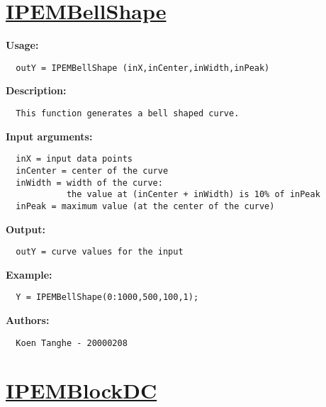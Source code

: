\newpage
\section*{\hyperlink{Concepts:IPEMBellShape}{IPEMBellShape}}
\hypertarget{FuncRef:IPEMBellShape}{}

\textbf{Usage:}
\begin{verbatim}  outY = IPEMBellShape (inX,inCenter,inWidth,inPeak)

\end{verbatim}
\textbf{Description:}
\begin{verbatim}  This function generates a bell shaped curve.

\end{verbatim}
\textbf{Input arguments:}
\begin{verbatim}  inX = input data points
  inCenter = center of the curve
  inWidth = width of the curve:
            the value at (inCenter + inWidth) is 10% of inPeak 
  inPeak = maximum value (at the center of the curve)

\end{verbatim}
\textbf{Output:}
\begin{verbatim}  outY = curve values for the input

\end{verbatim}
\textbf{Example:}
\begin{verbatim}  Y = IPEMBellShape(0:1000,500,100,1);

\end{verbatim}
\textbf{Authors:}
\begin{verbatim}  Koen Tanghe - 20000208
\end{verbatim}


\newpage
\section*{\hyperlink{Concepts:IPEMBlockDC}{IPEMBlockDC}}
\hypertarget{FuncRef:IPEMBlockDC}{}

